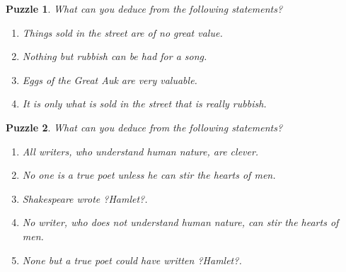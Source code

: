 \documentclass[11pt, oneside]{article}   	%
\newtheorem{puzzle}{Puzzle}
\begin{document}
\begin{puzzle} What can you deduce from the following statements?
\begin{enumerate}
\item Things sold in the street are of no great value.
\item Nothing but rubbish can be had for a song.
\item Eggs of the Great Auk are very valuable.
\item It is only what is sold in the street that is really rubbish.

\end{enumerate}
\end{puzzle}
\begin{puzzle} What can you deduce from the following statements?
\begin{enumerate}
\item All writers, who understand human nature, are clever.
\item No one is a true poet unless he can stir the hearts of men.
\item Shakespeare wrote ?Hamlet?.
\item No writer, who does not understand human nature, can stir the hearts of men.
\item None but a true poet could have written ?Hamlet?.

\end{enumerate}
\end{puzzle}
\end{document}
